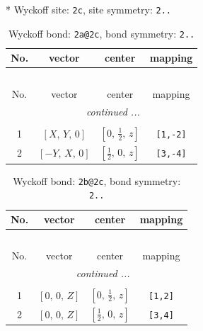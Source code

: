 \documentclass[fleqn,8pt]{jsarticle}
\begin{document}
* Wyckoff site: {\tt 2c}, site symmetry: {\tt 2..}
\renewcommand{\arraystretch}{1.2}
\begin{longtable}{cccc}
\caption{Wyckoff bond: {\tt 2a@2c}, bond symmetry: {\tt 2..}}
 \\
 \hline \hline
No. & vector & center & mapping \\ \hline \endfirsthead

\multicolumn{3}{l}{\tablename\ \thetable{}} \\
 \hline \hline
No. & vector & center & mapping \\ \hline \endhead

 \hline \hline
\multicolumn{3}{r}{\footnotesize\it continued ...} \\ \endfoot

 \hline \hline
\multicolumn{3}{r}{} \\ \endlastfoot

1 & $\left[ X,\, Y,\, 0 \right]$ & $\left[ 0,\, \frac{1}{2},\, z \right]$ & {\tt [1,-2]} \\ \hline
2 & $\left[ - Y,\, X,\, 0 \right]$ & $\left[ \frac{1}{2},\, 0,\, z \right]$ & {\tt [3,-4]} \\
\end{longtable}
\renewcommand{\arraystretch}{1.2}
\begin{longtable}{cccc}
\caption{Wyckoff bond: {\tt 2b@2c}, bond symmetry: {\tt 2..}}
 \\
 \hline \hline
No. & vector & center & mapping \\ \hline \endfirsthead

\multicolumn{3}{l}{\tablename\ \thetable{}} \\
 \hline \hline
No. & vector & center & mapping \\ \hline \endhead

 \hline \hline
\multicolumn{3}{r}{\footnotesize\it continued ...} \\ \endfoot

 \hline \hline
\multicolumn{3}{r}{} \\ \endlastfoot

1 & $\left[ 0,\, 0,\, Z \right]$ & $\left[ 0,\, \frac{1}{2},\, z \right]$ & {\tt [1,2]} \\ \hline
2 & $\left[ 0,\, 0,\, Z \right]$ & $\left[ \frac{1}{2},\, 0,\, z \right]$ & {\tt [3,4]} \\
\end{longtable}
\renewcommand{\arraystretch}{1.2}
\end{document}
